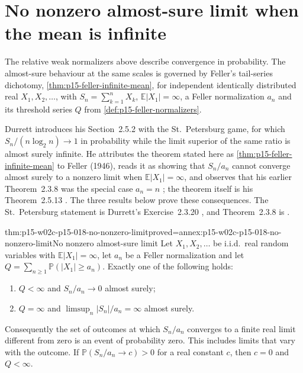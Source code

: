 \section{No nonzero almost-sure limit when the mean is infinite}
\label{sec:p15-w02c-p15-018-infinite-mean-limits}

The relative weak normalizers above describe convergence in
probability. The almost-sure behaviour at the same scales is governed
by Feller's tail-series dichotomy, \cref{thm:p15-feller-infinite-mean},
for independent identically distributed real \(X_1,X_2,\ldots\), with
\(S_n=\sum_{k=1}^nX_k\), \(\mathbb E|X_1|=\infty\), a Feller
normalization \(a_n\) and its threshold series \(Q\) from
\cref{def:p15-feller-normalizers}.

Durrett introduces his Section~2.5.2 with the St.~Petersburg game,
for which \(S_n/(n\log_2n)\to1\) in probability while the limit
superior of the same ratio is almost surely infinite. He attributes the
theorem stated here as \cref{thm:p15-feller-infinite-mean} to Feller
(1946), reads it as showing that \(S_n/a_n\) cannot converge almost
surely to a nonzero limit when \(\mathbb E|X_1|=\infty\), and observes
that his earlier Theorem~2.3.8 was the special case \(a_n=n\)
\cite[p.~88]{DurrettPTEAuthor2019}; the theorem itself is his
Theorem~2.5.13 \cite[p.~89]{DurrettPTEAuthor2019}. The three results
below prove these consequences. The St.~Petersburg statement is
Durrett's Exercise~2.3.20 \cite[p.~76]{DurrettPTEAuthor2019}, and
Theorem~2.3.8 is \cite[p.~70]{DurrettPTEAuthor2019}.

\begin{hbtheorem}{thm:p15-w02c-p15-018-no-nonzero-limit}{proved=annex:p15-w02c-p15-018-no-nonzero-limit}{No nonzero almost-sure limit}
Let \(X_1,X_2,\ldots\) be i.i.d.\ real random variables with
\(\mathbb E|X_1|=\infty\), let \(a_n\) be a Feller normalization and
let \(Q=\sum_{n\geq1}\mathbb P(|X_1|\geq a_n)\). Exactly one of the
following holds:
\begin{enumerate}
\item \(Q<\infty\) and \(S_n/a_n\to0\) almost surely;
\item \(Q=\infty\) and \(\limsup_n|S_n|/a_n=\infty\) almost surely.
\end{enumerate}
Consequently the set of outcomes at which \(S_n/a_n\) converges to a
finite real limit different from zero is an event of probability zero.
This includes limits that vary with the outcome. If
\(\mathbb P(S_n/a_n\to c)>0\) for a real constant \(c\), then \(c=0\)
and \(Q<\infty\).
\end{hbtheorem}

